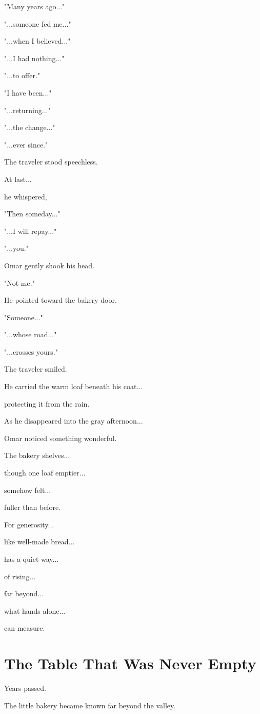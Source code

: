 \documentclass[12pt,openany]{book}
\begin{document}
"Many years ago..."

"...someone fed me..."

"...when I believed..."

"...I had nothing..."

"...to offer."

"I have been..."

"...returning..."

"...the change..."

"...ever since."

The traveler stood speechless.

At last...

he whispered,

"Then someday..."

"...I will repay..."

"...you."

Omar gently shook his head.

"Not me."

He pointed toward the bakery door.

"Someone..."

"...whose road..."

"...crosses yours."

The traveler smiled.

He carried the warm loaf beneath his coat...

protecting it from the rain.

As he disappeared into the gray afternoon...

Omar noticed something wonderful.

The bakery shelves...

though one loaf emptier...

somehow felt...

fuller than before.

For generosity...

like well-made bread...

has a quiet way...

of rising...

far beyond...

what hands alone...

can measure.
\section*{The Table That Was Never Empty}

Years passed.

The little bakery became known far beyond the valley.
\end{document}
